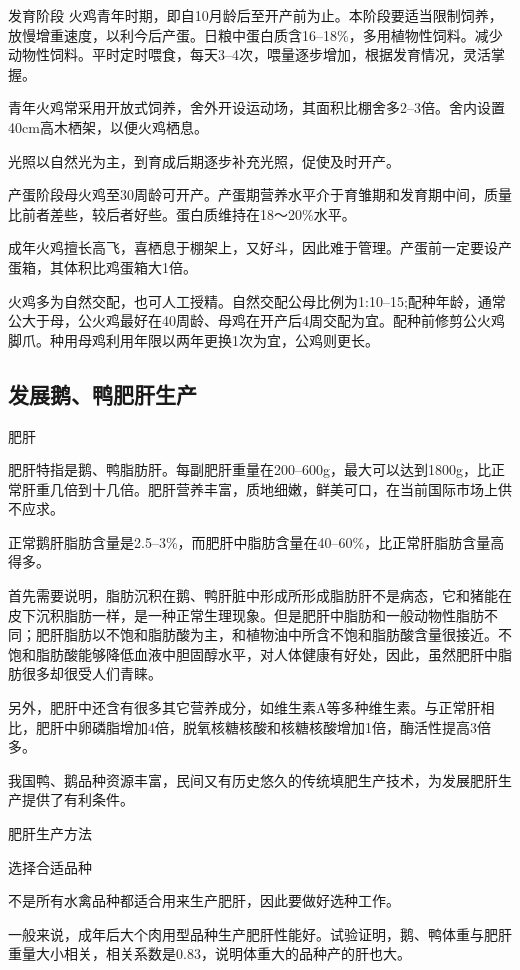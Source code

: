 \documentclass{ctexbook}
\begin{document}
发育阶段 火鸡青年时期，即自10月龄后至开产前为止。本阶段要适当限制饲养，放慢增重速度，以利今后产蛋。日粮中蛋白质含16--18\%，多用植物性饲料。减少动物性饲料。平时定时喂食，每天3--4次，喂量逐步增加，根据发育情况，灵活掌握。

青年火鸡常采用开放式饲养，舍外开设运动场，其面积比棚舍多2--3倍。舍内设置40cm高木栖架，以便火鸡栖息。

光照以自然光为主，到育成后期逐步补充光照，促使及时开产。

产蛋阶段母火鸡至30周龄可开产。产蛋期营养水平介于育雏期和发育期中间，质量比前者差些，较后者好些。蛋白质维持在18〜20\%水平。

成年火鸡擅长高飞，喜栖息于棚架上，又好斗，因此难于管理。产蛋前一定要设产蛋箱，其体积比鸡蛋箱大1倍。

火鸡多为自然交配，也可人工授精。自然交配公母比例为1:10--15;配种年龄，通常公大于母，公火鸡最好在40周龄、母鸡在开产后4周交配为宜。配种前修剪公火鸡脚爪。种用母鸡利用年限以两年更换1次为宜，公鸡则更长。
\subsection{发展鹅、鸭肥肝生产}
肥肝

肥肝特指是鹅、鸭脂肪肝。每副肥肝重量在200--600g，最大可以达到1800g，比正常肝重几倍到十几倍。肥肝营养丰富，质地细嫩，鲜美可口，在当前国际市场上供不应求。

正常鹅肝脂肪含量是2.5--3\%，而肥肝中脂肪含量在40--60\%，比正常肝脂肪含量高得多。

首先需要说明，脂肪沉积在鹅、鸭肝脏中形成所形成脂肪肝不是病态，它和猪能在皮下沉积脂肪一样，是一种正常生理现象。但是肥肝中脂肪和一般动物性脂肪不同；肥肝脂肪以不饱和脂肪酸为主，和植物油中所含不饱和脂肪酸含量很接近。不饱和脂肪酸能够降低血液中胆固醇水平，对人体健康有好处，因此，虽然肥肝中脂肪很多却很受人们青睐。

另外，肥肝中还含有很多其它营养成分，如维生素A等多种维生素。与正常肝相比，肥肝中卵磷脂增加4倍，脱氧核糖核酸和核糖核酸增加1倍，酶活性提高3倍多。

我国鸭、鹅品种资源丰富，民间又有历史悠久的传统填肥生产技术，为发展肥肝生产提供了有利条件。

肥肝生产方法

选择合适品种

不是所有水禽品种都适合用来生产肥肝，因此要做好选种工作。

一般来说，成年后大个肉用型品种生产肥肝性能好。试验证明，鹅、鸭体重与肥肝重量大小相关，相关系数是0.83，说明体重大的品种产的肝也大。
\end{document}
